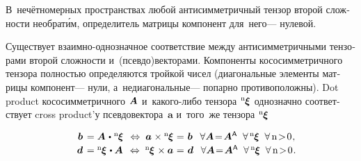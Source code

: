 \begin{otherlanguage}{russian}
В~нечётномерных пространствах любой антисимметричный тензор второй сложности необрат\'{и}м, определитель матрицы компонент для~него\:--- нулевой.

Существует взаимно\hbox{-}однозначное соответствие между антисимметричными тензорами второй сложности и~(псевдо)векторами. Компоненты кососимметричного тензора полностью определяются тройкой чисел (диагональные элементы матрицы компонент\:--- нули, а~недиагональные\:--- попарно противоположны). Dot product кососимметричного~${\hspace{-0.2ex}\bm{A}}$ и~какого\hbox{-}либо тензора~${\hspace{-0.2ex}{^\mathrm{n}\hspace{-0.12ex}\bm{\xi}}}$ однозначно соответствует cross product’у псевдовектора~$\bm{a}$ и~того~же тензора~${\hspace{-0.2ex}{^\mathrm{n}\hspace{-0.12ex}\bm{\xi}}}$

\nopagebreak\vspace{-0.1em}\begin{equation}\begin{array}{c}
\hspace{1.2em} \bm{b} \hspace{.3ex}
= \bm{A} \hspace{.2ex}\dotp\hspace{.1ex} {^\mathrm{n}\hspace{-0.12ex}\bm{\xi}}
\;\,\Leftrightarrow\;
\bm{a} \hspace{.1ex} \times {^\mathrm{n}\hspace{-0.12ex}\bm{\xi}}
\hspace{.1ex} = \hspace{.15ex} \bm{b} \hspace{.1ex} \;\:\:
\forall \bm{A} \!=\! \bm{A}^{\mathsf{\!\,A}} \;\;
\forall \, {^\mathrm{n}\hspace{-0.12ex}\bm{\xi}} \;\; \forall \,\mathrm{n \!>\! 0}
\hspace{.15ex} ,
\\[.2em]
%
\hspace{1.2em} \bm{d} \hspace{.3ex}
= {^\mathrm{n}\hspace{-0.12ex}\bm{\xi}} \hspace{.2ex} \dotp \bm{A}
\;\,\Leftrightarrow\;
{^\mathrm{n}\hspace{-0.12ex}\bm{\xi}} \hspace{.2ex}\times \bm{a}
\hspace{.1ex} = \hspace{.15ex} \bm{d} \hspace{.1ex} \;\:\:
\forall \bm{A} \!=\! \bm{A}^{\mathsf{\!\,A}} \;\;
\forall \, {^\mathrm{n}\hspace{-0.12ex}\bm{\xi}} \;\; \forall \,\mathrm{n \!>\! 0}
\hspace{.15ex} .
\end{array}\end{equation}


\end{otherlanguage}
